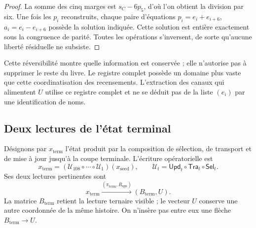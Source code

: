 \begin{proof}
La somme des cinq marges est \(s_C-6p_5\), d'où l'on obtient la
division par six. Une fois les \(p_i\) reconstruits, chaque paire d'équations
\(p_i=e_i+e_{i+6}\), \(a_i=e_i-e_{i+6}\) possède la solution indiquée.
Cette solution est entière exactement sous la congruence de parité. Toutes
les opérations s'inversent, de sorte qu'aucune liberté résiduelle ne subsiste.
\end{proof}

Cette réversibilité montre quelle information est conservée ; elle n'autorise pas à
supprimer le reste du livre. Le registre complet possède un domaine plus vaste
que cette coordinatisation des recensements. L'extraction des canaux qui alimentent
\(U\) utilise ce registre complet et ne se déduit pas de la liste
\((e_i)\) par une identification de noms.



\subsection{Deux lectures de l'état terminal}
\label{subsec:k-terminal}

Désignons par \(x_{\mathrm{term}}\) l'état produit par la composition de sélection, de transport et de mise à jour jusqu'à la coupe terminale. L'écriture opératorielle est
\[
 x_{\mathrm{term}}=
 (\mathcal U_{108}\circ\cdots\circ\mathcal U_1)(x_{\mathrm{seed}}),
 \qquad \mathcal U_t=\mathsf{Upd}_t\circ\mathsf{Tra}_t\circ\mathsf{Sel}_t.
\]
Ses deux lectures pertinentes sont
\[
 x_{\mathrm{term}}
 \xrightarrow{(\pi_{\mathrm{term}},R_{\mathrm{sgn}})}
 (B_{\mathrm{term}},U).
\]
La matrice \(B_{\mathrm{term}}\) retient la lecture ternaire visible ; le vecteur \(U\) conserve une autre coordonnée de la même histoire. On n'insère pas entre eux une flèche \(B_{\mathrm{term}}\to U\).

